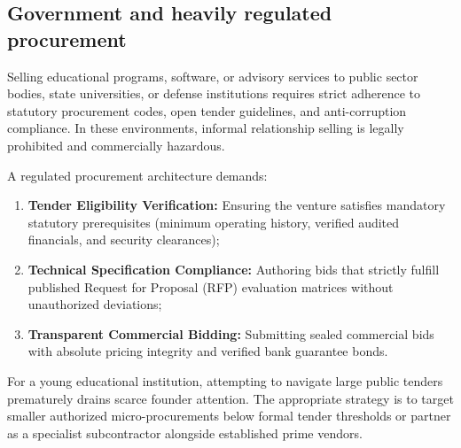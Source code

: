 \subsection{Government and heavily regulated procurement}

Selling educational programs, software, or advisory services to public sector bodies, state universities, or defense institutions requires strict adherence to statutory procurement codes, open tender guidelines, and anti-corruption compliance. In these environments, informal relationship selling is legally prohibited and commercially hazardous.

A regulated procurement architecture demands:
\begin{enumerate}
\item \textbf{Tender Eligibility Verification:} Ensuring the venture satisfies mandatory statutory prerequisites (minimum operating history, verified audited financials, and security clearances);
\item \textbf{Technical Specification Compliance:} Authoring bids that strictly fulfill published Request for Proposal (RFP) evaluation matrices without unauthorized deviations;
\item \textbf{Transparent Commercial Bidding:} Submitting sealed commercial bids with absolute pricing integrity and verified bank guarantee bonds.
\end{enumerate}
For a young educational institution, attempting to navigate large public tenders prematurely drains scarce founder attention. The appropriate strategy is to target smaller authorized micro-procurements below formal tender thresholds or partner as a specialist subcontractor alongside established prime vendors.
